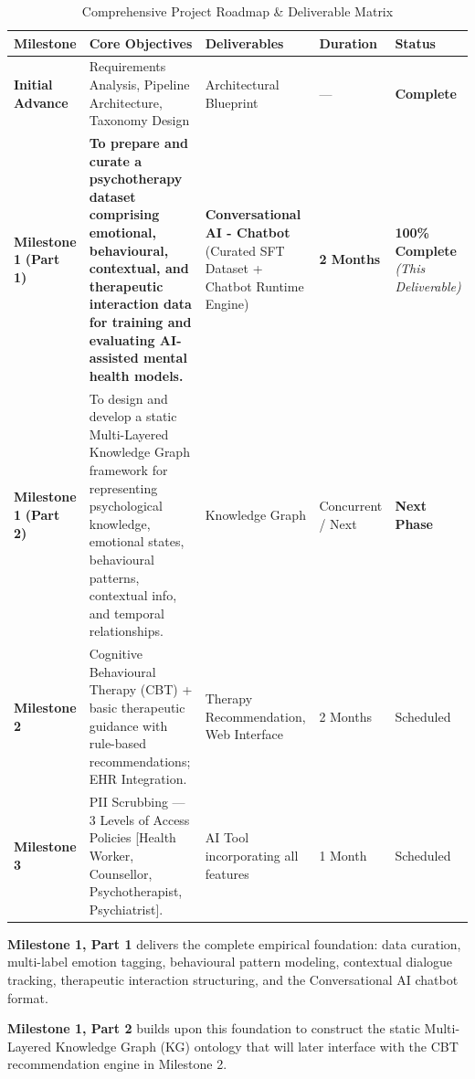 \documentclass[11pt,a4paper]{article}
\begin{document}
\begin{table}[H]
\centering
\small
\sffamily
\caption{Comprehensive Project Roadmap \& Deliverable Matrix}
\label{tab:roadmap}
\begin{tabularx}{\linewidth}{p{2.2cm}Xp{3.8cm}p{1.6cm}p{2.2cm}}
\toprule
\textbf{Milestone} & \textbf{Core Objectives} & \textbf{Deliverables} & \textbf{Duration} & \textbf{Status} \\
\midrule
\textbf{Initial Advance} & Requirements Analysis, Pipeline Architecture, Taxonomy Design & Architectural Blueprint & --- & \textcolor{successgreen}{\textbf{Complete}} \\
\midrule
\textbf{Milestone 1} \newline \textbf{(Part 1)} & \textbf{To prepare and curate a psychotherapy dataset comprising emotional, behavioural, contextual, and therapeutic interaction data for training and evaluating AI-assisted mental health models.} & \textbf{Conversational AI - Chatbot} \newline (Curated SFT Dataset + Chatbot Runtime Engine) & \textbf{2 Months} & \textcolor{successgreen}{\textbf{100\% Complete}} \newline \textit{(This Deliverable)} \\
\midrule
\textbf{Milestone 1} \newline \textbf{(Part 2)} & To design and develop a static Multi-Layered Knowledge Graph framework for representing psychological knowledge, emotional states, behavioural patterns, contextual info, and temporal relationships. & Knowledge Graph & Concurrent / Next & \textcolor{primaryblue}{\textbf{Next Phase}} \\
\midrule
\textbf{Milestone 2} & Cognitive Behavioural Therapy (CBT) + basic therapeutic guidance with rule-based recommendations; EHR Integration. & Therapy Recommendation, Web Interface & 2 Months & Scheduled \\
\midrule
\textbf{Milestone 3} & PII Scrubbing --- 3 Levels of Access Policies [Health Worker, Counsellor, Psychotherapist, Psychiatrist]. & AI Tool incorporating all features & 1 Month & Scheduled \\
\bottomrule
\end{tabularx}
\end{table}

\begin{tcolorbox}[clinicalBox={Deliverable Distinction: Part 1 vs. Part 2}]
\textbf{Milestone 1, Part 1} delivers the complete empirical foundation: data curation, multi-label emotion tagging, behavioural pattern modeling, contextual dialogue tracking, therapeutic interaction structuring, and the Conversational AI chatbot format. 

\textbf{Milestone 1, Part 2} builds upon this foundation to construct the static Multi-Layered Knowledge Graph (KG) ontology that will later interface with the CBT recommendation engine in Milestone 2.
\end{tcolorbox}
\end{document}
